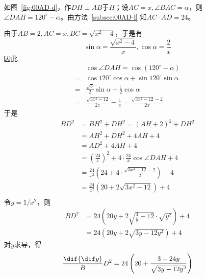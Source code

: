 如图~\ref{fig:00AD-d}，作$DH \perp AB$于$H$；设$AC = x, \angle BAC = \alpha$，则$\angle DAH = 120^\circ - \alpha$。由方法~\ref{subsec:00AD-l} 知$AC\cdot AD = 24$。

由于$AB = 2, AC = x, BC = \sqrt{x^2 - 4}$，于是有
\[ \sin\alpha = \frac{\sqrt{x^2 - 4}}x, \cos\alpha = \frac2x \]
因此
\begin{align*}
  & \cos\angle DAH = \cos(120^\circ - \alpha) \\
  ={}& \cos120^\circ\cos\alpha + \sin120^\circ\sin\alpha \\
  ={}& \frac{\sqrt3}2\sin\alpha - \frac12\cos\alpha \\
  ={}& \frac{\sqrt{3x^2 - 12}}{2x} - \frac1x = \frac{\sqrt{3x^2 - 12} - 2}{2x}
\end{align*}
于是
\begin{align*}
  BD^2 &= BH^2 + DH^2 = (AH + 2)^2 + DH^2 \\
  &= AH^2 + DH^2 + 4AH + 4 \\
  &= AD^2 + 4AH + 4 \\
  &= \left(\frac{24}x\right)^2 + 4\cdot\frac{24}x\cos\angle DAH + 4 \\
  &= \frac{24}{x^2}\left(24 + 4\cdot\frac{\sqrt{3x^2 - 12} - 2}2\right) + 4 \\
  &= \frac{24}{x^2}\left(20 + 2\sqrt{3x^2 - 12}\right) + 4 \\
\end{align*}
令$y = 1/x^2$，则
\begin{align*}
  BD^2 &= 24\left(20y + 2\sqrt{\frac3y - 12}\cdot\sqrt{y^2}\right) + 4 \\
  &= 24\left(20y + 2\sqrt{3y - 12y^2}\right) + 4
\end{align*}
对$y$求导，得
\[ \frac\dif{\dif y}BD^2 = 24\left(20 + \frac{3 - 24y}{\sqrt{3y - 12y^2}}\right) \]

